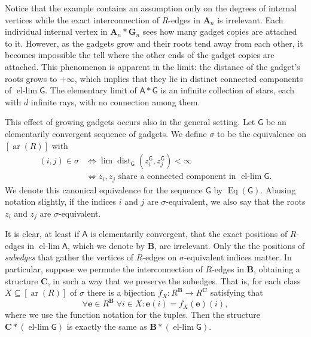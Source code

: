 \documentclass[11pt]{article}
\theoremstyle{plain}
\theoremstyle{definition}
\theoremstyle{remark}
\DeclareMathOperator\dist{dist}
\DeclareMathOperator\Eq{Eq}
\DeclareMathOperator\aritysym{ar}
\newcommand{\arity}[1]{{\aritysym({#1})}}
\newcommand{\str}[1]{\mathbf{#1}}
\newcommand{\strseq}[1]{{\boldsymbol{\mathsf{#1}}}}
\newcommand{\tpl}[1]{{\bm{#1}}}
\DeclareMathOperator{\ellim}{el-lim}
\begin{document}
Notice that the example contains an assumption only on the degrees of internal vertices while the exact interconnection of $R$-edges in $\str{A}_n$ is irrelevant.
Each individual internal vertex in $\str{A}_n*\str{G}_n$ sees how many gadget copies are attached to it.
However, as the gadgets grow and their roots tend away from each other, it becomes impossible the tell where the other ends of the gadget copies are attached.
This phenomenon is apparent in the limit: the distance of the gadget's roots grows to $+\infty$, which implies that they lie in distinct connected components of $\ellim \strseq{G}$.
The elementary limit of $\strseq{A}*\strseq{G}$ is an infinite collection of stars, each with $d$ infinite rays, with no connection among them.

This effect of growing gadgets occurs also in the general setting.
Let $\strseq{G}$ be an elementarily convergent sequence of gadgets.
We define $\sigma$ to be the equivalence on $[\arity{R}]$ with
\begin{equation}\label{eq:canonical_sigma}
\begin{aligned}
    (i,j) \in \sigma 
    &\Leftrightarrow 
    \lim \dist_\strseq{G}(z_i^\strseq{G}, z_j^\strseq{G}) < \infty \\
    &\Leftrightarrow
    z_i, z_j \text{ share a connected component in } \ellim \strseq{G}
    .
\end{aligned}
\end{equation}
We denote this canonical equivalence for the sequence $\strseq{G}$ by $\Eq(\strseq{G})$.
Abusing notation slightly, if the indices $i$ and $j$ are $\sigma$-equivalent, we also say that the roots $z_i$ and $z_j$ are $\sigma$-equivalent.

It is clear, at least if $\strseq{A}$ is elementarily convergent, that the exact positions of $R$-edges in $\ellim \strseq{A}$, which we denote by $\str{B}$, are irrelevant.
Only the the positions of \emph{subedges} that gather the vertices of $R$-edges on $\sigma$-equivalent indices matter.
In particular, suppose we permute the interconnection of $R$-edges in $\str{B}$, obtaining a structure $\str{C}$, in such a way that we preserve the subedges.
That is, for each class $X \subseteq [\arity{R}]$ of $\sigma$ there is a bijection $f_X: R^\str{B} \to R^\str{C}$ satisfying that
\[
    \forall \tpl{e} \in R^\str{B}
    \;
    \forall i \in X : \tpl{e}(i) = f_X(\tpl{e})(i)
    ,
\]
where we use the function notation for the tuples.
Then the structure $\str{C} * (\ellim \strseq{G})$ is exactly the same as $\str{B} * (\ellim \strseq{G})$.
\end{document}
